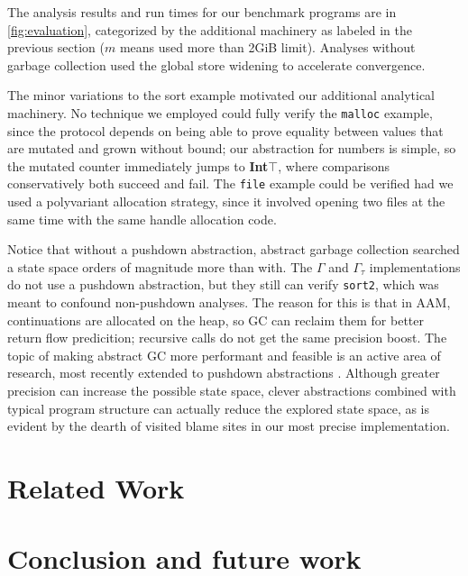 The analysis results and run times for our benchmark programs are in \autoref{fig:evaluation}, categorized by the additional machinery as labeled in the previous section ($m$ means used more than 2GiB limit).
%
Analyses without garbage collection used the global store widening to accelerate convergence.

The minor variations to the sort example motivated our additional analytical machinery.
%
No technique we employed could fully verify the {\tt malloc} example, since the protocol depends on being able to prove equality between values that are mutated and grown without bound; our abstraction for numbers is simple, so the mutated counter immediately jumps to \textbf{Int}$\top$, where comparisons conservatively both succeed and fail.
%
The {\tt file} example could be verified had we used a polyvariant allocation strategy, since it involved opening two files at the same time with the same handle allocation code.

Notice that without a pushdown abstraction, abstract garbage collection searched a state space orders of magnitude more than with.
%
The $\Gamma$ and $\Gamma_\tau$ implementations do not use a pushdown abstraction, but they still can verify {\tt sort2}, which was meant to confound non-pushdown analyses.
%
The reason for this is that in AAM, continuations are allocated on the heap, so GC can reclaim them for better return flow predicition; recursive calls do not get the same precision boost.
%
The topic of making abstract GC more performant and feasible is an active area of research, most recently extended to pushdown abstractions \citep{dvanhorn:Earl2012Introspective}.
%
Although greater precision can increase the possible state space, clever abstractions combined with typical program structure can actually reduce the explored state space, as is evident by the dearth of visited blame sites in our most precise implementation.

\section{Related Work}


\section{Conclusion and future work} \label{sec:conclusion}

